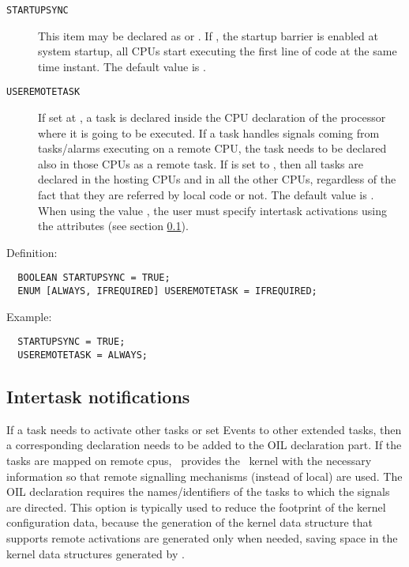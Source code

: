 \begin{description}
\item [{\tt STARTUPSYNC}] This item may be declared as  or
  . If , the startup barrier is enabled at
  system startup, all CPUs start executing the first line of code at
  the same time instant. The default value is .

\item [{\tt USEREMOTETASK}] If set at , a task is
  declared inside the CPU declaration of the processor where it is
  going to be executed. If a task handles signals coming from
  tasks/alarms executing on a remote CPU, the task needs to be
  declared also in those CPUs as a remote task. If
   is set to , then all tasks are
  declared in the hosting CPUs and in all the other CPUs, regardless
  of the fact that they are referred by local code or not. The default
  value is . When using the value
  , the user must specify intertask activations
  using the  attributes (see section
  \ref{sec:intertask-notifications}). 
\end{description}

Definition:

\begin{lstlisting}
  BOOLEAN STARTUPSYNC = TRUE;
  ENUM [ALWAYS, IFREQUIRED] USEREMOTETASK = IFREQUIRED; 
\end{lstlisting}

Example:

\begin{lstlisting}
  STARTUPSYNC = TRUE;
  USEREMOTETASK = ALWAYS;
\end{lstlisting}


\subsection{Intertask notifications}
\label{sec:intertask-notifications}
If a task needs to activate other tasks or set Events to other
extended tasks, then a corresponding declaration needs to be added to
the OIL declaration part. If the tasks are mapped on remote cpus,
\rtd\ provides the \ee\ kernel with the necessary information so that
remote signalling mechanisms (instead of local) are used. The OIL
declaration requires the names/identifiers of the tasks to which the
signals are directed. This option is typically used to reduce the
footprint of the kernel configuration data, because the generation of
the kernel data structure that supports remote activations are
generated only when needed, saving space in the kernel data structures
generated by \rtd.

